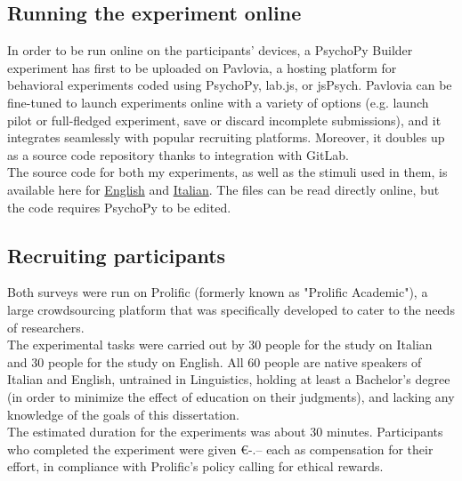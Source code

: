\subsection{Running the experiment online} 
In order to be run online on the participants' devices, a PsychoPy Builder experiment has first to be uploaded on Pavlovia, a hosting platform for behavioral experiments coded using PsychoPy, lab.js, or jsPsych. Pavlovia can be fine-tuned to launch experiments online with a variety of options (e.g. launch pilot or full-fledged experiment, save or discard incomplete submissions), and it integrates seamlessly with popular recruiting platforms. Moreover, it doubles up as a source code repository thanks to integration with GitLab.\\
The source code for both my experiments, as well as the stimuli used in them, is available here for \href{https://gitlab.pavlovia.org/gcappelli/grammaticality_eng}{English} and \href{https://gitlab.pavlovia.org/gcappelli/grammaticality_ita}{Italian}. The files can be read directly online, but the code requires PsychoPy to be edited.

\subsection{Recruiting participants} 
Both surveys were run on Prolific (formerly known as "Prolific Academic"), a large crowdsourcing platform that was specifically developed to cater to the needs of researchers.\\
The experimental tasks were carried out by 30 people for the study on Italian and 30 people for the study on English. All 60 people are native speakers of Italian and English, untrained in Linguistics, holding at least a Bachelor's degree (in order to minimize the effect of education on their judgments), and lacking any knowledge of the goals of this dissertation.\\
The estimated duration for the experiments was about 30 minutes. Participants who completed the experiment were given €-.-- each as compensation for their effort, in compliance with Prolific's policy calling for ethical rewards.


